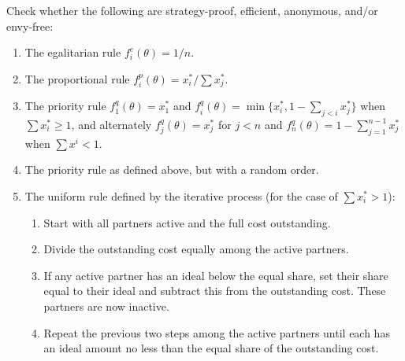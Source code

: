 \documentclass[10pt]{article}
\begin{document}
\begin{spacing}{1.0}
\begin{exercise}[Sprumont 1991]
  \hspace{1em}
  Check whether the following are strategy-proof,
  efficient, anonymous, and/or envy-free:
  \begin{enumerate}
  \item The egalitarian rule $f_i^e(\theta) = 1/n$.
  \item The proportional rule $f_i^p(\theta) = x_i^*/\sum x_j^*$.
  \item The priority rule $f_1^q(\theta) = x_1^*$ and
    $f_i^q(\theta) = \min\{x_i^*, 1-\sum_{j<i} x_j^*\}$
    when $\sum x_i^* \geq 1$, and alternately $f_j^q(\theta) = x_j^*$
    for $j < n$ and $f_n^q(\theta) = 1 - \sum_{j=1}^{n-1}
    x_j^*$ when $\sum x^i < 1$.
  \item The priority rule as defined above, but with a random order.
  \item The uniform rule defined by the iterative process (for the case of
    $\sum x_i^* > 1$):
    \begin{enumerate}
    \item Start with all partners active and the full cost outstanding.
    \item Divide the outstanding cost equally among the active partners.
    \item If any active partner has an ideal below the equal
      share, set their share equal to their ideal and
      subtract this from the outstanding cost. These
      partners are now inactive.
    \item Repeat the previous two steps among the active
      partners until each has an ideal amount no less
      than the equal share of the outstanding cost.
    \end{enumerate}

  \end{enumerate}

\end{exercise}


\end{spacing}
\end{document}
